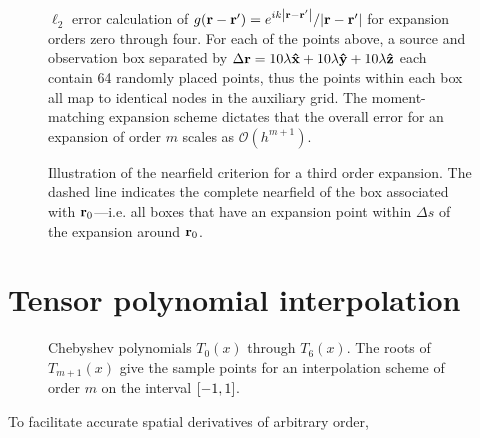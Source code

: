 \begin{figure}
  \centering
  
  \caption{\label{fig:grid convergence} $\ell_2$ error calculation of $g(\vb{r} - \vb{r}') = e^{i k \abs{\vb{r} - \vb{r}'}}/{\abs{\vb{r} - \vb{r}'}}$ for expansion orders zero through four.
    For each of the points above, a source and observation box separated by $\Delta \vb{r} = 10\lambda \vu{x} + 10 \lambda \vu{y} + 10 \lambda \vu{z}$ each contain 64 randomly placed points, thus the points within each box all map to identical nodes in the auxiliary grid. 
    The moment-matching expansion scheme dictates that the overall error for an expansion of order $m$ scales as $\mathcal{O}(h^{m + 1})$.
  }
\end{figure}

\begin{figure}
  \centering
  
  \caption{\label{fig:nearfield criterion}Illustration of the nearfield criterion for a third order expansion.
    The dashed line indicates the complete nearfield of the box associated with \textcolor{cbblue}{$\vb{r}_0$}---i.e. all boxes that have an expansion point within $\Delta s$ of the expansion around \textcolor{cbblue}{$\vb{r}_0$}.
  }
\end{figure}

\section{Tensor polynomial interpolation}

\begin{figure}
  \centering
  \caption{\label{fig:chebyshev polynomials} Chebyshev polynomials $T_0(x)$ through $T_6(x)$.
    The roots of $T_{m + 1}(x)$ give the sample points for an interpolation scheme of order $m$ on the interval $\qty[-1, 1]$.
  }
\end{figure}

To facilitate accurate spatial derivatives of arbitrary order, 


